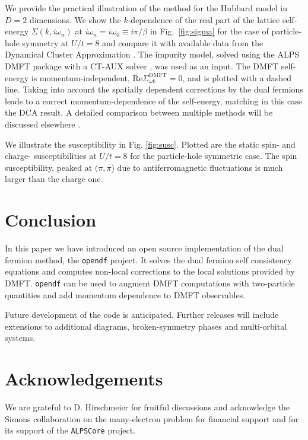 \documentclass[3p,times,procedia]{elsarticle}
\begin{document}
We provide the practical illustration of the method for the Hubbard model in $D=2$ dimensions. We show the $k$-dependence of the real part of the lattice self-energy $\Sigma(k, i\omega_n)$ at $i\omega_n=i\omega_0 \equiv i\pi/\beta$ in Fig.~\ref{fig:sigma} for the case of particle-hole symmetry at $U/t=8$ and compare it with available data from the Dynamical Cluster Approximation \cite{MaierJarrell:2005}. The impurity model, solved using the ALPS DMFT \cite{ALPSDMFT} package with a CT-AUX solver \cite{Gull2008b}, was used as an input. The DMFT self-energy is momentum-independent, $\mathrm{Re} \Sigma_{\omega k}^{\mathrm{DMFT}} = 0$, and is plotted with a dashed line. Taking into account the spatially dependent corrections by the dual fermions leads to a correct momentum-dependence of the self-energy, matching in this case the DCA result. A detailed comparison between multiple methods will be discussed elsewhere \cite{LeBlanc2015}. 

We illustrate the susceptibility in Fig. \ref{fig:susc}. Plotted are the static spin- and charge- susceptibilities at $U/t = 8$ for the particle-hole symmetric case. The spin susceptibility, peaked at $(\pi,\pi$) due to antiferromagnetic fluctuations is much larger than the charge one. 

\section{Conclusion}\label{sec:conclusions}
In this paper we have introduced an open source implementation of the dual fermion method, the \texttt{opendf} project. It solves the dual fermion self consistency equations and computes non-local corrections to the local solutions provided by DMFT.  \texttt{opendf} can be used to augment DMFT computations with two-particle quantities and add momentum dependence to DMFT observables. 

Future development of the code is anticipated. Further releases will include extensions to additional diagrams, broken-symmetry phases and multi-orbital systems. 

\section*{Acknowledgements}
We are grateful to D. Hirschmeier for fruitful discussions and acknowledge the Simons collaboration on the many-electron problem for financial support and for its support of the \texttt{ALPSCore} project.


\end{document}
